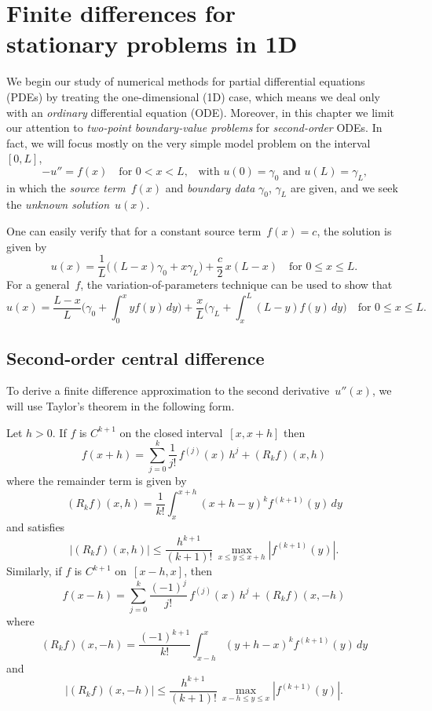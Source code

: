 \chapter[Finite differences in 1D]{Finite differences for \\ 
stationary problems in 1D}
\label{chap: finite diff 1d}
We begin our study of numerical methods for partial differential equations 
(PDEs) by treating the one-dimensional (1D) case, which means we deal only with 
an \emph{ordinary} differential equation (ODE).  Moreover, in this chapter we 
limit our attention to \emph{two-point boundary-value problems} for 
\emph{second-order} ODEs.  In fact, we will focus mostly on the very simple 
model problem on the interval~$[0,L]$,
\begin{equation}\label{eq: model 1d}
-u''=f(x)\quad\text{for $0<x<L$,}
	\quad\text{with $u(0)=\gamma_0$ and $u(L)=\gamma_L$,}
\end{equation}
in which the \emph{source term}~$f(x)$ and \emph{boundary data} $\gamma_0$, 
$\gamma_L$ are given, and we seek the \emph{unknown solution}~$u(x)$.

One can easily verify that for a constant source term~$f(x)=c$, the solution is 
given by
\[
u(x)=\frac{1}{L}\bigl((L-x)\gamma_0+x\gamma_L\bigr)+\frac{c}{2}\,x(L-x)
	\quad\text{for $0\le x\le L$.}
\]
For a general~$f$, the variation-of-parameters technique can be used to show 
that
\begin{equation}\label{eq: model 1d exact soln}
u(x)=\frac{L-x}{L}\biggl(\gamma_0+\int_0^x yf(y)\,dy\biggr)
	+\frac{x}{L}\biggl(\gamma_L+\int_x^L(L-y)f(y)\,dy\biggr)
	\quad\text{for $0\le x\le L$.}
\end{equation}

\begin{theorem}

\end{theorem}


\section{Second-order central difference}
To derive a finite difference approximation to the second derivative~$u''(x)$, 
we will use Taylor's theorem in the following form.

\begin{theorem}\label{thm: Taylor remainder}
Let $h>0$. If $f$ is $C^{k+1}$ on the closed interval~$[x,x+h]$ then
\[
f(x+h)=\sum_{j=0}^k\frac{1}{j!}\,f^{(j)}(x)\,h^j+(R_kf)(x,h)
\]
where the remainder term is given by
\[
(R_kf)(x,h)=\frac{1}{k!}\int_x^{x+h}(x+h-y)^kf^{(k+1)}(y)\,dy
\]
and satisfies
\[
|(R_kf)(x,h)|\le\frac{h^{k+1}}{(k+1)!}\,\max_{x\le y\le x+h}|f^{(k+1)}(y)|.
\]
Similarly, if $f$ is $C^{k+1}$ on~$[x-h,x]$, then
\[
f(x-h)=\sum_{j=0}^k\frac{(-1)^j}{j!}\,f^{(j)}(x)\,h^j+(R_kf)(x,-h)
\]
where 
\[
(R_kf)(x,-h)=\frac{(-1)^{k+1}}{k!}\int_{x-h}^x(y+h-x)^kf^{(k+1)}(y)\,dy
\]
and
\[
|(R_kf)(x,-h)|\le\frac{h^{k+1}}{(k+1)!}\,\max_{x-h\le y\le x}|f^{(k+1)}(y)|.
\]
\end{theorem}

